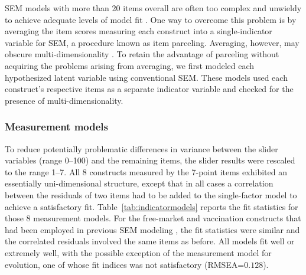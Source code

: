 \documentclass[fignum,man]{apa}\usepackage[]{graphicx}\usepackage[]{color}
\begin{document}
SEM models with more than 20 items overall are often 
too complex and unwieldy to achieve adequate 
levels of model fit \cite{Bentler87}.
One way to overcome this problem 
is by averaging the item scores measuring 
each construct into a single-indicator 
variable for SEM, a procedure known as item parceling.
Averaging, however, may obscure multi-dimensionality \cite{Little02}. 
To retain the advantage of parceling without acquiring 
the problems arising from averaging, 
we first modeled each hypothesized 
latent variable using conventional SEM. These models
used each construct's respective items as a separate indicator 
variable and checked for the presence of multi-dimensionality.

\subsubsection{Measurement models}
To reduce potentially
problematic differences in variance between the slider variables (range 0--100)
and the remaining items, the slider results were rescaled to the range 1--7. 
All 8 constructs measured by the 7-point items 
exhibited an essentially uni-dimensional
structure, except that in all cases a 
correlation between the residuals of two items
had to be
added to the single-factor model to achieve a satisfactory fit.
Table~\ref{tab:indicatormodels} reports the fit statistics for  those 
8 measurement models. For the free-market and vaccination constructs that
had been employed in previous SEM modeling \cite{Lewandowsky13b}, 
the fit statistics were similar and the
correlated residuals involved the same items as before.
All models fit well or extremely well, with the possible 
exception of the measurement model for evolution, one of
whose fit indices was not satisfactory (RMSEA=$0.128$).
\end{document}
